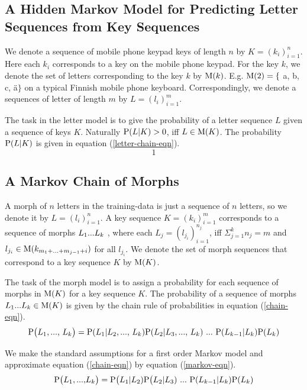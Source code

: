 \documentclass{llncs}
\begin{document}
\subsection{A Hidden Markov Model for Predicting Letter Sequences from Key Sequences}

We denote a sequence of mobile phone keypad keys of length $n$ by $K =
(k_i)_{i=1}^{n}$. Here each $k_i$ corresponds to a key on the mobile
phone keypad. For the key $k$, we denote the set of letters
corresponding to the key $k$ by ${\rm M}(k)$. E.g. ${\rm M}(2) = \{$
a, b, c, \"{a}$\}$ on a typical Finnish mobile phone
keyboard. Correspondingly, we denote a sequences of letter of length
$m$ by $L = (l_i)_{i=1}^{m}$.

The task in the letter model is to give the probability of a letter
sequence $L$ given a sequence of keys $K$. Naturally ${\rm P}(L|K) > 0$, iff
$L \in {\rm M}(K)$. The probability ${\rm P}(L|K)$ is given in equation (\ref{letter-chain-eqn}).  
\begin{equation}\label{letter-chain-eqn}
1
\end{equation}

\subsection{A Markov Chain of Morphs}

A morph of $n$ letters in the training-data is just a sequence of $n$
letters, so we denote it by $L = (l_i)_{i=1}^{n}$. A key sequence $K =
(k_i)_{i=1}^{m}$ corresponds to a sequence of morphs $L_1{\rm
  ... }L_k$ , where each $L_j = (l_{j_i})_{i=1}^{n_j}$, iff $\Sigma_{j
  = 1}^{k} n_j = m$ and $l_{j_i} \in {\rm M}(k_{m_1 + {\rm ... } +
  m_{j - 1} + i})$ for all $l_{j_i}$. We denote the set of morph
sequences that correspond to a key sequence $K$ by ${\rm M}(K)$.

The task of the morph model is to assign a probability for each
sequence of morphs in ${\rm M}(K)$ for a key sequence $K$. The
probability of a sequence of morphs $L_1{\rm ... }L_k \in {\rm M}(K)$
is given by the chain rule of probabilities in equation
(\ref{chain-eqn}).
\begin{equation}\label{chain-eqn}
{\rm P}\big(L_1{\rm, ..., }\ L_k\big) = {\rm P}(L_1 | L_2 {\rm, ..., }\ L_k) {\rm P}(L_2 | L_3 {\rm, ..., }\ L_k)\ {\rm ... }\ {\rm P}(L_{k-1} | L_k){\rm P}(L_k)
\end{equation}

We make the standard assumptions for a first order Markov model and approximate equation (\ref{chain-eqn}) by equation (\ref{markov-eqn}).
\begin{equation}\label{markov-eqn}
{\rm P}\big(L_1{\rm, ..., }L_k\big) = {\rm P}\big(L_1 | L_2){\rm P}\big(L_2 | L_3)\ {\rm ... }\ {\rm P}(L_{k-1} | L_k){\rm P}(L_k)
\end{equation}
\end{document}

